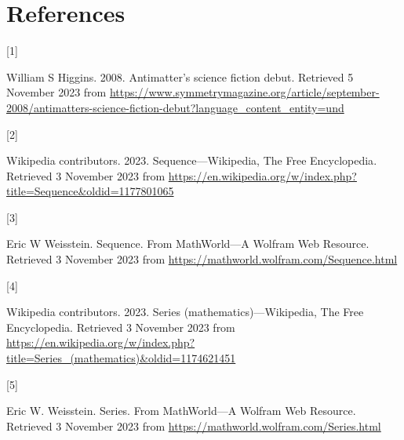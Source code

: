 \documentclass[
  a4paper,
]{article}
\newlength{\cslhangindent}
\newlength{\csllabelwidth}
\newlength{\cslentryspacingunit} %
\newenvironment{CSLReferences}[2] %
 {%
  \setlength{\parindent}{0pt}
  \ifodd #1
  \let\oldpar\par
  \def\par{\hangindent=\cslhangindent\oldpar}
  \fi
  \setlength{\parskip}{#2\cslentryspacingunit}
 }%
 {}
\newcommand{\CSLLeftMargin}[1]{\parbox[t]{\csllabelwidth}{#1}}
\newcommand{\CSLRightInline}[1]{\parbox[t]{\linewidth - \csllabelwidth}{#1}\break}
\begin{document}
\hypertarget{bibliography}{%
\section*{References}\label{bibliography}}

\hypertarget{refs}{}
\begin{CSLReferences}{0}{0}
\leavevmode{}%
\CSLLeftMargin{{[}1{]} }%
\CSLRightInline{William S Higgins. 2008. {Antimatter's science fiction
debut}. Retrieved 5 November 2023 from
\url{https://www.symmetrymagazine.org/article/september-2008/antimatters-science-fiction-debut?language_content_entity=und}}

\leavevmode{}%
\CSLLeftMargin{{[}2{]} }%
\CSLRightInline{Wikipedia contributors. 2023. {Sequence---{Wikipedia}{,}
The Free Encyclopedia}. Retrieved 3 November 2023 from
\url{https://en.wikipedia.org/w/index.php?title=Sequence\&oldid=1177801065}}

\leavevmode{}%
\CSLLeftMargin{{[}3{]} }%
\CSLRightInline{Eric W Weisstein. {Sequence. From MathWorld---A Wolfram
Web Resource}. Retrieved 3 November 2023 from
\url{https://mathworld.wolfram.com/Sequence.html}}

\leavevmode{}%
\CSLLeftMargin{{[}4{]} }%
\CSLRightInline{Wikipedia contributors. 2023. {Series
(mathematics)---{Wikipedia}{,} The Free Encyclopedia}. Retrieved 3
November 2023 from
\url{https://en.wikipedia.org/w/index.php?title=Series_(mathematics)\&oldid=1174621451}}

\leavevmode{}%
\CSLLeftMargin{{[}5{]} }%
\CSLRightInline{Eric W. Weisstein. {Series. From MathWorld---A Wolfram
Web Resource}. Retrieved 3 November 2023 from
\url{https://mathworld.wolfram.com/Series.html}}

\end{CSLReferences}
\end{document}
